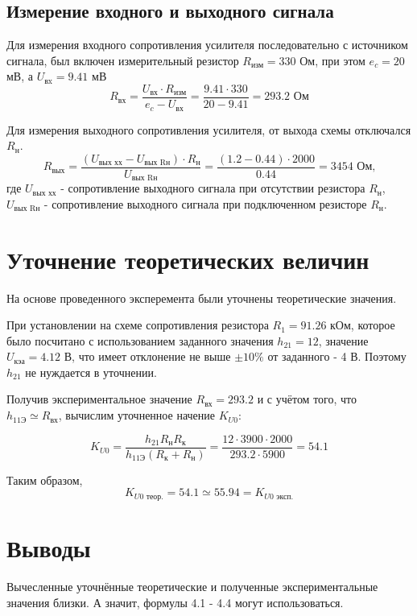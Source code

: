 \subsection{Измерение входного и выходного сигнала}

Для измерения входного сопротивления усилителя последовательно с источником сигнала, был включен измерительный резистор $R_\text{изм} = 330$ Ом, при этом $e_c = 20$ мВ, а $U_\text{вx} = 9.41$ мВ
\begin{displaymath}
R_\text{вх} = \frac{U_\text{вх} \cdot R_\text{изм}}{e_c - U_\text{вх}} = \frac{9.41 \cdot 330}{20 - 9.41} = 293.2 \text{ Ом}
\end{displaymath}

Для измерения выходного сопротивления усилителя, от выхода схемы отключался $R_\text{н}$.
\begin{displaymath}
R_\text{вых} = \frac{(U_\text{вых хх} - U_\text{вых Rн}) \cdot R_\text{н}}{U_\text{вых Rн}} = \frac{(1.2 - 0.44) \cdot 2000}{0.44} = 3454 \text{ Ом,}
\end{displaymath}
где $U_\text{вых хх}$ - сопротивление выходного сигнала при отсутствии резистора $R_\text{н}$, $U_\text{вых Rн}$ - сопротивление выходного сигнала при подключенном резисторе $R_\text{н}$.

\section{Уточнение теоретических величин}

На основе проведенного эксперемента были уточнены теоретические значения.

При установлении на схеме сопротивления резистора $R_1 = 91.26$ кОм, которое было посчитано с использованием заданного значения $h_21 = 12$, значение $U_\text{кэа} = 4.12$ В, что имеет отклонение не выше $\pm 10 \%$ от заданного - 4 В. Поэтому $h_21$ не нуждается в уточнении.


Получив экспериментальное значение $R_\text{вх} = 293.2$ и с учётом того, что $h_{11\text{Э}} \simeq R_\text{вх}$, вычислим уточненное начение $K_{U0}$: 

\begin{equation*}
K_{U0} = \frac{h_{21}R_\text{н}R_\text{к}}{h_\text{11Э}(R_\text{к}+R_\text{н})} = \frac{12 \cdot 3900 \cdot 2000}{293.2 \cdot 5900} = 54.1
\end{equation*}

Таким образом, 
\begin{equation*}
K_{U0\text{ теор.}} = 54.1 \simeq 55.94 = K_{U0\text{ эксп.}}
\end{equation*}

\section{Выводы}
Вычесленные уточнённые теоретические и полученные экспериментальные значения близки. А значит, формулы 4.1 - 4.4 могут использоваться.

